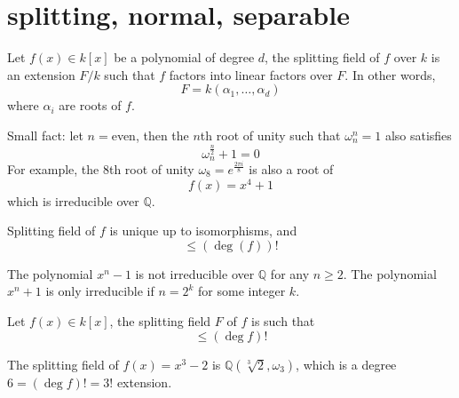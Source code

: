 \documentclass[openany]{book}
\newcommand{\Q}{\mathbb{Q}}
\newcommand{\om}{\omega}
\begin{document}
\section{splitting, normal, separable}




\begin{defn}
    Let $f(x)\in k[x]$ be a polynomial of degree $d$, the splitting field of $f$ over $k$ is an extension $F/k$ such that $f$ factors into linear factors over $F$. In other words, 
    \begin{equation*}
        F=k(\alpha_1,\dots, \alpha_d)
    \end{equation*}
    where $\alpha_i$ are roots of $f$.
\end{defn}



\begin{prop}
    Small fact: let $n=$even, then the $n$th root of unity such that $\om_n^n=1$ also satisfies 
    \begin{equation*}
        \om_n^\frac{n}{2}+1=0
    \end{equation*}
    For example, the $8$th root of unity $\om_8=e^{\frac{2\pi i}{8}}$ is also a root of 
    \begin{equation*}
        f(x)=x^4+1
    \end{equation*}
    which is irreducible over $\Q$.
\end{prop}

\begin{prop}
    Splitting field of $f$ is unique up to isomorphisms, and 
    \begin{equation*}
        [F:k]\leq(\deg(f))!
    \end{equation*}
\end{prop}

\begin{prop}
    The polynomial $x^n-1$ is not irreducible over $\Q$ for any $n\geq 2$. The polynomial $x^n+1$ is only irreducible if $n=2^k$ for some integer $k$.
\end{prop}


\begin{prop}
    Let $f(x)\in k[x]$, the splitting field $F$ of $f$ is such that 
    \begin{equation*}
        [F:k]\leq (\deg f)!
    \end{equation*}
\end{prop}
\begin{example}
    The splitting field of $f(x)=x^3-2$ is $\Q(\sqrt[3]{2}, \om_3)$, which is a degree $6=(\deg f)!=3!$ extension. 
\end{example}
\end{document}
